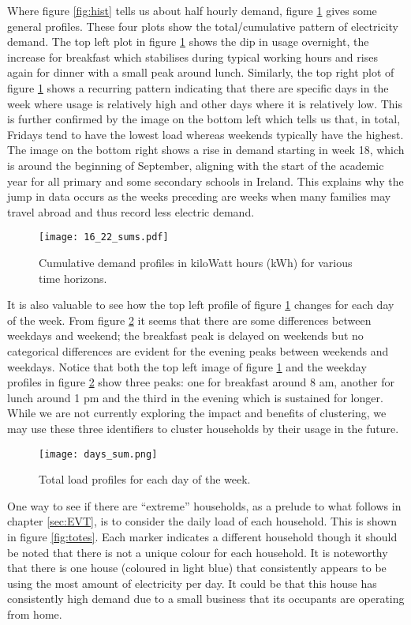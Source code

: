 Where figure \ref{fig:hist} tells us about half hourly demand, figure \ref{fig:sums} gives some general profiles. These four plots show the total/cumulative pattern of electricity demand. The top left plot in figure \ref{fig:sums} shows the dip in usage overnight, the increase for breakfast which stabilises during typical working hours and rises again for dinner with a small peak around lunch. Similarly, the top right plot of figure \ref{fig:sums} shows a recurring pattern indicating that there are specific days in the week where usage is relatively high and other days where it is relatively low. This is further confirmed by the image on the bottom left which tells us that, in total, Fridays tend to have the lowest load whereas weekends typically have the highest. The image on the bottom right shows a rise in demand starting in week 18, which is around the beginning of September, aligning with the start of the academic year for all primary and some secondary schools in Ireland. This explains why the jump in data occurs as the weeks preceding are weeks when many families may travel abroad and thus record less electric demand.

\begin{figure}
\centering
\texttt{[image: 16\_22\_sums.pdf]}
\caption{Cumulative demand profiles in kiloWatt hours (kWh) for various time horizons.}
\label{fig:sums} 
\end{figure}

It is also valuable to see how the top left profile of figure \ref{fig:sums} changes for each day of the week. From figure \ref{fig:days} it seems that there are some differences between weekdays and weekend; the breakfast peak is delayed on weekends but no categorical differences are evident for the evening peaks between weekends and weekdays. Notice that both the top left image of figure \ref{fig:sums} and the weekday profiles in figure \ref{fig:days} show three peaks: one for breakfast around 8 am, another for lunch around 1 pm and the third in the evening which is sustained for longer. While we are not currently exploring the impact and benefits of clustering, we may use these three identifiers to cluster households by their usage in the future.

\begin{figure}
\centering
\texttt{[image: days\_sum.png]}
\caption{Total load profiles for each day of the week.}
\label{fig:days} 
\end{figure}

One way to see if there are ``extreme'' households, as a prelude to what follows in chapter \ref{sec:EVT}, is to consider the daily load of each household. This is shown in figure \ref{fig:totes}. Each marker indicates a different household though it should be noted that there is not a unique colour for each household. It is noteworthy that there is one house (coloured in light blue) that consistently appears to be using the most amount of electricity per day. It could be that this house has consistently high demand due to a small business that its occupants are operating from home.

